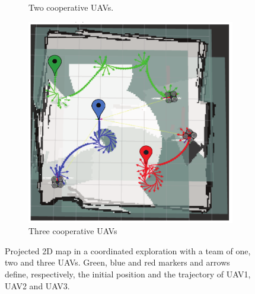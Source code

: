 \documentclass[11pt,openany]{book}
\begin{document}
\begin{figure}[H]
\begin{subfigure}[H]{0.5\linewidth}
        \caption{{Two cooperative UAVs.}}
        \label{fig:3.16b}
    \end{subfigure}
    \begin{subfigure}[H]{0.5\linewidth}
        \includegraphics[width=\linewidth]{assets/3_16_c.png}
        \caption{{Three cooperative UAVs}}
        \label{fig:3.16c}
    \end{subfigure}
    \caption{Projected 2D map in a coordinated exploration with a team of one, two and three UAVs. Green, blue and red markers and arrows define, respectively, the initial position and the trajectory of UAV1, UAV2 and UAV3.}
    \label{fig:3.16}
\end{figure}
\end{document}
